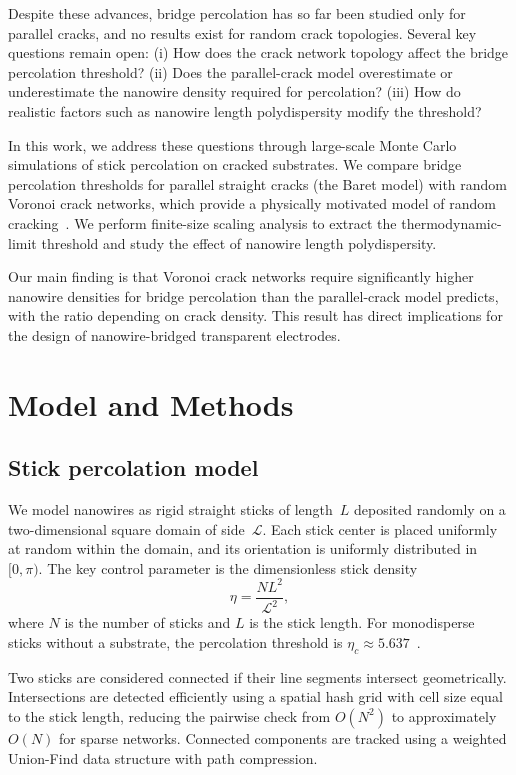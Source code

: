 Despite these advances, bridge percolation has so far been
studied only for parallel cracks, and no results exist for
random crack topologies.
Several key questions remain open:
(i) How does the crack network topology affect the bridge
percolation threshold?
(ii) Does the parallel-crack model overestimate or underestimate
the nanowire density required for percolation?
(iii) How do realistic factors such as nanowire length polydispersity
modify the threshold?

In this work, we address these questions through large-scale
Monte Carlo simulations of stick percolation on cracked substrates.
We compare bridge percolation thresholds for parallel straight cracks
(the Baret model) with random Voronoi crack networks,
which provide a physically motivated model of random
cracking~\cite{Bohn2005}.
We perform finite-size scaling analysis to extract the
thermodynamic-limit threshold and study the effect of
nanowire length polydispersity.

Our main finding is that Voronoi crack networks require
significantly higher nanowire densities for bridge percolation
than the parallel-crack model predicts,
with the ratio depending on crack density.
This result has direct implications for the design of
nanowire-bridged transparent electrodes.


\section{Model and Methods}

\subsection{Stick percolation model}

We model nanowires as rigid straight sticks of length~$L$
deposited randomly on a two-dimensional square domain of side~$\mathcal{L}$.
Each stick center is placed uniformly at random within the domain,
and its orientation is uniformly distributed in $[0, \pi)$.
The key control parameter is the dimensionless stick density
\begin{equation}
  \eta = \frac{N L^2}{\mathcal{L}^2},
  \label{eq:eta}
\end{equation}
where $N$ is the number of sticks and $L$ is the stick length.
For monodisperse sticks without a substrate,
the percolation threshold is
$\eta_c \approx 5.637$~\cite{Li2009,Balberg1983,Tarasevich2018}.

Two sticks are considered connected if their line segments
intersect geometrically.
Intersections are detected efficiently using a spatial hash grid
with cell size equal to the stick length,
reducing the pairwise check from $O(N^2)$ to approximately $O(N)$
for sparse networks.
Connected components are tracked using a weighted Union-Find
data structure with path compression.

